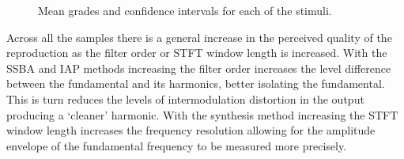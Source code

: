 \begin{figure}[h!]
		\quad
		\caption{Mean grades and confidence intervals for each of the stimuli.}
		\label{fig:SMCResults}
	\end{figure}

	Across all the samples there is a general increase in the perceived quality of the reproduction as the filter order
	or STFT window length is increased. With the SSBA and IAP methods increasing the filter order increases the level
	difference between the fundamental and its harmonics, better isolating the fundamental.  This is turn reduces the
	levels of intermodulation distortion in the output producing a `cleaner' harmonic.  With the synthesis method
	increasing the STFT window length increases the frequency resolution allowing for the amplitude envelope of the
	fundamental frequency to be measured more precisely.

